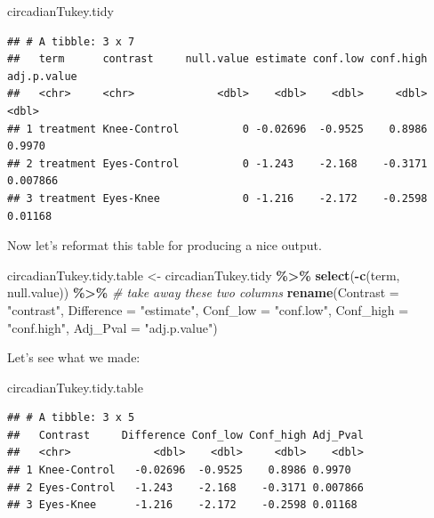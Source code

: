 \documentclass[
]{book}
\newenvironment{Shaded}{\begin{snugshade}}{\end{snugshade}}
\newcommand{\AttributeTok}[1]{\textcolor[rgb]{0.13,0.29,0.53}{#1}}
\newcommand{\CommentTok}[1]{\textcolor[rgb]{0.56,0.35,0.01}{\textit{#1}}}
\newcommand{\FunctionTok}[1]{\textcolor[rgb]{0.13,0.29,0.53}{\textbf{#1}}}
\newcommand{\NormalTok}[1]{#1}
\newcommand{\OtherTok}[1]{\textcolor[rgb]{0.56,0.35,0.01}{#1}}
\newcommand{\SpecialCharTok}[1]{\textcolor[rgb]{0.81,0.36,0.00}{\textbf{#1}}}
\newcommand{\StringTok}[1]{\textcolor[rgb]{0.31,0.60,0.02}{#1}}
\begin{document}
\begin{Shaded}
\begin{Highlighting}[]
\NormalTok{circadianTukey.tidy}
\end{Highlighting}
\end{Shaded}

\begin{verbatim}
## # A tibble: 3 x 7
##   term      contrast     null.value estimate conf.low conf.high adj.p.value
##   <chr>     <chr>             <dbl>    <dbl>    <dbl>     <dbl>       <dbl>
## 1 treatment Knee-Control          0 -0.02696  -0.9525    0.8986    0.9970  
## 2 treatment Eyes-Control          0 -1.243    -2.168    -0.3171    0.007866
## 3 treatment Eyes-Knee             0 -1.216    -2.172    -0.2598    0.01168
\end{verbatim}

Now let's reformat this table for producing a nice output.

\begin{Shaded}
\begin{Highlighting}[]
\NormalTok{circadianTukey.tidy.table }\OtherTok{\textless{}{-}}\NormalTok{ circadianTukey.tidy }\SpecialCharTok{\%\textgreater{}\%}
  \FunctionTok{select}\NormalTok{(}\SpecialCharTok{{-}}\FunctionTok{c}\NormalTok{(term, null.value)) }\SpecialCharTok{\%\textgreater{}\%}  \CommentTok{\# take away these two columns}
  \FunctionTok{rename}\NormalTok{(}\AttributeTok{Contrast =} \StringTok{"contrast"}\NormalTok{, }\AttributeTok{Difference =} \StringTok{"estimate"}\NormalTok{, }
         \AttributeTok{Conf\_low =} \StringTok{"conf.low"}\NormalTok{, }\AttributeTok{Conf\_high =} \StringTok{"conf.high"}\NormalTok{, }
         \AttributeTok{Adj\_Pval =} \StringTok{"adj.p.value"}\NormalTok{)}
\end{Highlighting}
\end{Shaded}

Let's see what we made:

\begin{Shaded}
\begin{Highlighting}[]
\NormalTok{circadianTukey.tidy.table}
\end{Highlighting}
\end{Shaded}

\begin{verbatim}
## # A tibble: 3 x 5
##   Contrast     Difference Conf_low Conf_high Adj_Pval
##   <chr>             <dbl>    <dbl>     <dbl>    <dbl>
## 1 Knee-Control   -0.02696  -0.9525    0.8986 0.9970  
## 2 Eyes-Control   -1.243    -2.168    -0.3171 0.007866
## 3 Eyes-Knee      -1.216    -2.172    -0.2598 0.01168
\end{verbatim}
\end{document}
